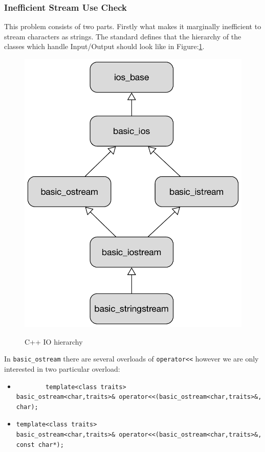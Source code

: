 \subsubsection{Inefficient Stream Use Check}
\par This problem consists of two parts. Firstly what makes it marginally inefficient to stream characters as strings. The standard defines that the hierarchy of the classes which handle Input/Output should look like in Figure:\ref{cpp_io_hierarch}.
\begin{figure}[H]
	\caption{C++ IO hierarchy}
	\centering
	\includegraphics[scale=0.6]{images/cpp_io_structure.pdf}
	\label{cpp_io_hierarch}
\end{figure}
\par In \verb|basic_ostream| there are several overloads of \verb|operator<<| however we are only interested in two particular overload:
\begin{itemize}
	\item \begin{verbatim}
		template<class traits>
basic_ostream<char,traits>& operator<<(basic_ostream<char,traits>&,
char);
	\end{verbatim}
	\item \begin{verbatim}
template<class traits>
basic_ostream<char,traits>& operator<<(basic_ostream<char,traits>&,
const char*);
\end{verbatim}
\end{itemize}\cite[\S27.7.3.6.4]{cpp_standard}
